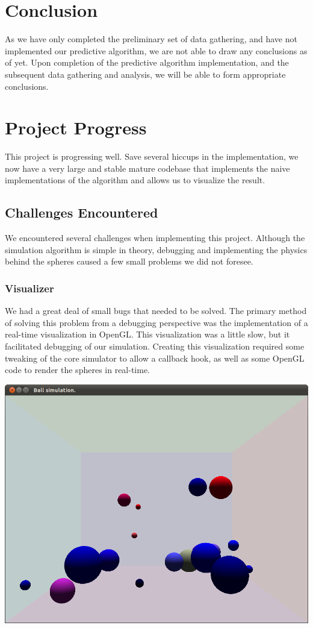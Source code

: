 \documentclass[conference]{IEEEtran}
\begin{document}
\section{Conclusion} 


As we have only completed the preliminary set of data gathering, and have not implemented our predictive algorithm, we are not able to draw any conclusions as of yet.  Upon completion of the predictive algorithm implementation, and the subsequent data gathering and analysis, we will be able to form appropriate conclusions.




\appendix %
\section{Project Progress}
This project is progressing well.  Save several hiccups in the implementation, we now have a very large and stable mature codebase that implements the naive implementations of the algorithm and allows
us to visualize the result.
\subsection{Challenges Encountered}
We encountered several challenges when implementing this project.  Although the simulation algorithm is simple in theory, debugging and implementing the physics behind the spheres caused a few small problems we did not foresee.

\subsubsection{Visualizer}
We had a great deal of small bugs that needed to be solved.  The primary method of solving this problem from a debugging perspective was the implementation of a real-time visualization in OpenGL.
This visualization was a little slow, but it facilitated debugging of our simulation.  Creating this visualization required some tweaking of the core simulator to allow a callback hook, as well as some OpenGL code to render the spheres in real-time.

\begin{center}
	\includegraphics[width=.45\textwidth]{few.png}
	\label{fig:few}
\end{center}
\end{document}
